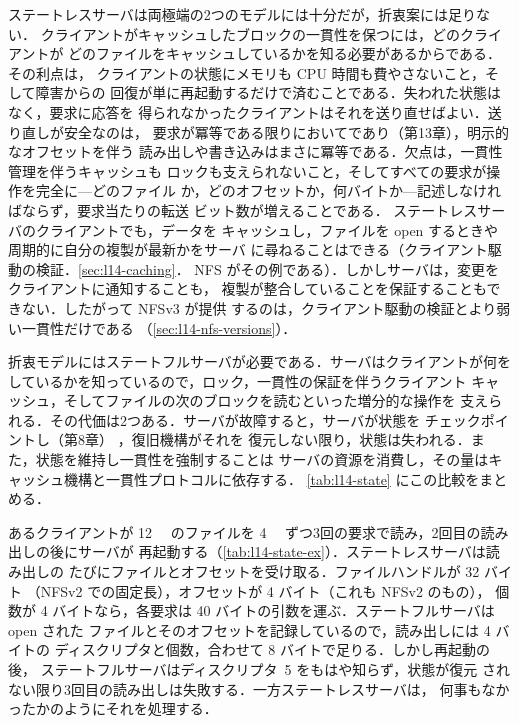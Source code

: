 \documentclass[../main.tex]{subfiles}
\begin{document}
ステートレスサーバは両極端の2つのモデルには十分だが，折衷案には足りない．
クライアントがキャッシュしたブロックの一貫性を保つには，どのクライアントが
どのファイルをキャッシュしているかを知る必要があるからである．その利点は，
クライアントの状態にメモリも CPU 時間も費やさないこと，そして障害からの
回復が単に再起動するだけで済むことである．失われた状態はなく，要求に応答を
得られなかったクライアントはそれを送り直せばよい．送り直しが安全なのは，
要求が冪等である限りにおいてであり（第13章），明示的なオフセットを伴う
読み出しや書き込みはまさに冪等である．欠点は，一貫性管理を伴うキャッシュも
ロックも支えられないこと，そしてすべての要求が操作を完全に---どのファイル
か，どのオフセットか，何バイトか---記述しなければならず，要求当たりの転送
ビット数が増えることである．
ステートレスサーバのクライアントでも，データを
キャッシュし，ファイルを open するときや周期的に自分の複製が最新かをサーバ
に尋ねることはできる（クライアント駆動の検証．\cref{sec:l14-caching}．
NFS がその例である）．しかしサーバは，変更をクライアントに通知することも，
複製が整合していることを保証することもできない．したがって NFSv3 が提供
するのは，クライアント駆動の検証とより弱い一貫性だけである
（\cref{sec:l14-nfs-versions}）．

折衷モデルにはステートフルサーバが必要である．サーバはクライアントが何を
しているかを知っているので，ロック，一貫性の保証を伴うクライアント
キャッシュ，そしてファイルの次のブロックを読むといった増分的な操作を
支えられる．その代価は2つある．サーバが故障すると，サーバが状態を
チェックポイントし（第8章）%
，復旧機構がそれを
復元しない限り，状態は失われる．また，状態を維持し一貫性を強制することは
サーバの資源を消費し，その量はキャッシュ機構と一貫性プロトコルに依存する．
\cref{tab:l14-state} にこの比較をまとめる．

\begin{example}
  あるクライアントが \SI{12}{\kibi\byte} のファイルを
  \SI{4}{\kibi\byte} ずつ3回の要求で読み，2回目の読み出しの後にサーバが
  再起動する（\cref{tab:l14-state-ex}）．ステートレスサーバは読み出しの
  たびにファイルとオフセットを受け取る．ファイルハンドルが 32 バイト
  （NFSv2 での固定長），オフセットが 4 バイト（これも NFSv2 のもの），
  個数が 4 バイトなら，各要求は 40 バイトの引数を運ぶ．ステートフルサーバは open された
  ファイルとそのオフセットを記録しているので，読み出しには 4 バイトの
  ディスクリプタと個数，合わせて 8 バイトで足りる．しかし再起動の後，
  ステートフルサーバはディスクリプタ~5 をもはや知らず，状態が復元
  されない限り3回目の読み出しは失敗する．一方ステートレスサーバは，
  何事もなかったかのようにそれを処理する．
\end{example}
\end{document}
